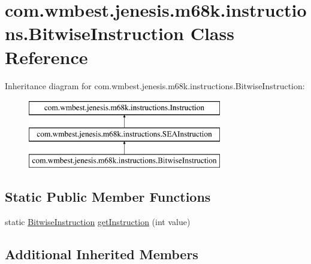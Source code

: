 \hypertarget{classcom_1_1wmbest_1_1jenesis_1_1m68k_1_1instructions_1_1BitwiseInstruction}{\section{com.\-wmbest.\-jenesis.\-m68k.\-instructions.\-Bitwise\-Instruction Class Reference}
\label{classcom_1_1wmbest_1_1jenesis_1_1m68k_1_1instructions_1_1BitwiseInstruction}
}
Inheritance diagram for com.\-wmbest.\-jenesis.\-m68k.\-instructions.\-Bitwise\-Instruction\-:\begin{figure}[H]
\begin{center}
\leavevmode
\includegraphics[height=3.000000cm]{classcom_1_1wmbest_1_1jenesis_1_1m68k_1_1instructions_1_1BitwiseInstruction}
\end{center}
\end{figure}
\subsection*{Static Public Member Functions}
\begin{DoxyCompactItemize}
\item 
static \hyperlink{classcom_1_1wmbest_1_1jenesis_1_1m68k_1_1instructions_1_1BitwiseInstruction}{Bitwise\-Instruction} \hyperlink{classcom_1_1wmbest_1_1jenesis_1_1m68k_1_1instructions_1_1BitwiseInstruction_a79df961b77eeae4ef50ebc9990a3d55c}{get\-Instruction} (int value)
\end{DoxyCompactItemize}
\subsection*{Additional Inherited Members}


